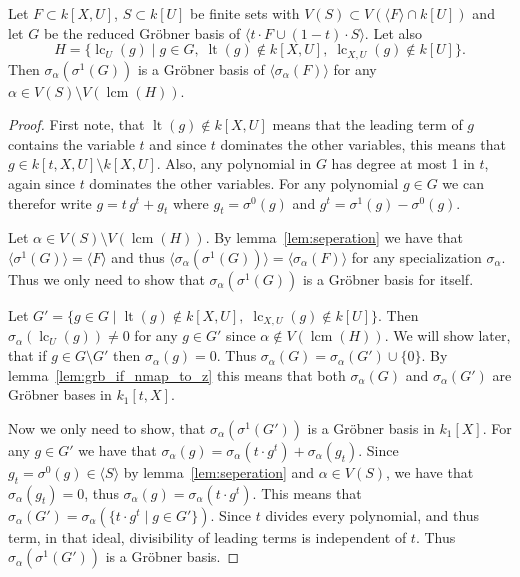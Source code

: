 \documentclass[a4paper, 12pt]{article}
\DeclareMathOperator{\LT}{lt}
\DeclareMathOperator{\LC}{lc}
\DeclareMathOperator{\lcm}{lcm}
\theoremstyle{changedot}
\theoremstyle{changedotbreak}
\theoremstyle{nonumberplain}
\newtheorem{proof}{Proof}
\begin{document}
\begin{lemma}\label{lem:grb_if_nmap_to_z_t}
  Let $F \subset k[X, U]$, $S \subset k[U]$ be finite sets with $V(S) \subset V(\langle F \rangle \cap k[U])$ and let $G$ be the reduced Gröbner basis of $\langle t\cdot F \cup (1-t)\cdot S \rangle$. Let also \[H = \{\LC_{U}(g) \mid g \in G,\; \LT(g) \notin k[X, U],\; \LC_{X, U}(g) \notin k[U]\}.\] Then $\sigma_{\alpha}(\sigma^{1}(G))$ is a Gröbner basis of $\langle \sigma_{\alpha}(F) \rangle$ for any $\alpha \in V(S) \setminus V(\lcm(H))$.
\end{lemma}
\begin{proof}
  First note, that $\LT(g) \notin k[X, U]$ means that the leading term of $g$ contains the variable $t$ and since $t$ dominates the other variables, this means that $g \in k[t, X, U] \setminus k[X, U]$. Also, any polynomial in $G$ has degree at most 1 in $t$, again since $t$ dominates the other variables. For any polynomial $g \in G$ we can therefor write $g = t\,g^{t} + g_{t}$ where $g_{t} = \sigma^{0}(g)$ and $g^{t} = \sigma^{1}(g) - \sigma^{0}(g)$.

  Let $\alpha \in V(S) \setminus V(\lcm(H))$. By lemma~\ref{lem:seperation} we have that $\langle \sigma^{1}(G) \rangle = \langle F \rangle$ and thus $\langle \sigma_{\alpha}(\sigma^{1}(G)) \rangle = \langle \sigma_{\alpha}(F) \rangle$ for any specialization $\sigma_{\alpha}$. Thus we only need to show that $\sigma_{\alpha}(\sigma^{1}(G))$ is a Gröbner basis for itself.

  Let $G' = \{g \in G \mid \LT(g) \notin k[X, U],\; \LC_{X, U}(g) \notin k[U]\}$. Then $\sigma_{\alpha}(\LC_{U}(g)) \neq 0$ for any $g \in G'$ since $\alpha \notin V(\lcm(H))$. We will show later, that if $g \in G \setminus G'$ then $\sigma_{\alpha}(g) = 0$. Thus $\sigma_{\alpha}(G) = \sigma_{\alpha}(G') \cup \{0\}$. By lemma~\ref{lem:grb_if_nmap_to_z} this means that both $\sigma_{\alpha}(G)$ and $\sigma_{\alpha}(G')$ are Gröbner bases in $k_{1}[t, X]$.

  Now we only need to show, that $\sigma_{\alpha}(\sigma^{1}(G'))$ is a Gröbner basis in $k_{1}[X]$. For any $g \in G'$ we have that $\sigma_{\alpha}(g) = \sigma_{\alpha}(t\cdot g^{t}) + \sigma_{\alpha}(g_{t})$. Since $g_{t} = \sigma^{0}(g) \in \langle S \rangle$ by lemma~\ref{lem:seperation} and $\alpha \in V(S)$, we have that $\sigma_{\alpha}(g_{t}) = 0$, thus $\sigma_{\alpha}(g) = \sigma_{\alpha}(t \cdot g^{t})$. This means that $\sigma_{\alpha}(G') = \sigma_{\alpha}(\{t \cdot g^{t} \mid g \in G'\})$. Since $t$ divides every polynomial, and thus term, in that ideal, divisibility of leading terms is independent of $t$. Thus $\sigma_{\alpha}(\sigma^{1}(G'))$ is a Gröbner basis.


\end{proof}
\end{document}
